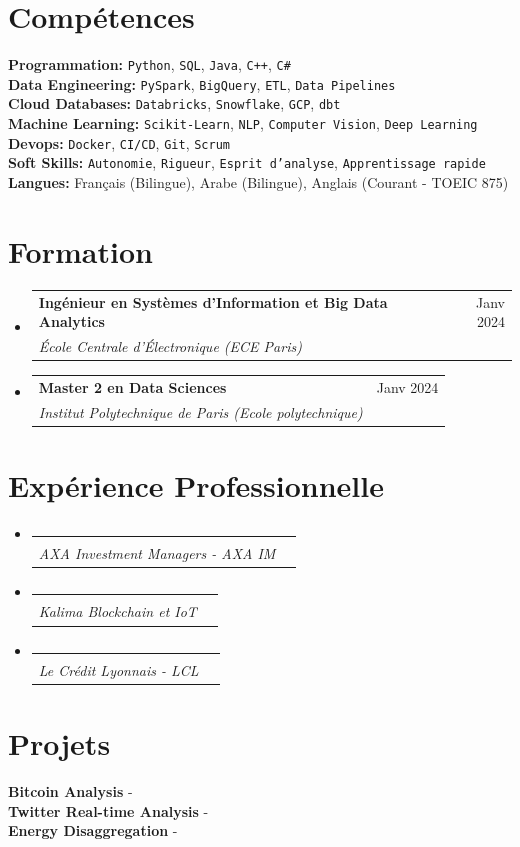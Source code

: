 \documentclass[11pt,a4paper]{article}
\makeatletter
\newcommand{\resumeSubheading}[4]{
  \vspace{2pt}\item
    \begin{tabular*}{\textwidth}[t]{l@{\extracolsep{\fill}}r}
      {\footnotesize\textbf{#1}} & {\footnotesize#2} \\
      {\footnotesize\textit{#3}} & {\footnotesize\textit{#4}} \\
    \end{tabular*}\vspace{2pt}
}
\newcommand{\resumeSubHeadingListStart}{\begin{itemize}[leftmargin=0in, label={}]}
\newcommand{\resumeSubHeadingListEnd}{\end{itemize}}
\newcommand{\resumeItemListStart}{\begin{itemize}[label={\textbullet}]}
\newcommand{\resumeItemListEnd}{\end{itemize}\vspace{0pt}}
\makeatother
\begin{document}
\vspace{10pt}
\section{Compétences}
\textbf{Programmation:} \texttt{Python}, \texttt{SQL}, \texttt{Java}, \texttt{C++}, \texttt{C#} \\
\textbf{Data Engineering:} \texttt{PySpark}, \texttt{BigQuery}, \texttt{ETL}, \texttt{Data Pipelines} \\
\textbf{Cloud Databases:} \texttt{Databricks}, \texttt{Snowflake}, \texttt{GCP}, \texttt{dbt} \\
\textbf{Machine Learning:} \texttt{Scikit-Learn}, \texttt{NLP}, \texttt{Computer Vision}, \texttt{Deep Learning} \\
\textbf{Devops:} \texttt{Docker}, \texttt{CI/CD}, \texttt{Git}, \texttt{Scrum} \\
\textbf{Soft Skills:} \texttt{Autonomie}, \texttt{Rigueur}, \texttt{Esprit d'analyse}, \texttt{Apprentissage rapide} \\
\textbf{Langues:} Français (Bilingue), Arabe (Bilingue), Anglais (Courant - TOEIC 875) \\

\vspace{10pt}
\section{Formation}
\resumeSubHeadingListStart
\resumeSubheading
{Ingénieur en Systèmes d'Information et Big Data Analytics}{Janv 2024}
{École Centrale d'Électronique (ECE Paris)}{}

\resumeSubheading
{Master 2 en Data Sciences}{Janv 2024}
{Institut Polytechnique de Paris (Ecole polytechnique)}{}

\resumeSubHeadingListEnd

\vspace{10pt}
\section{Expérience Professionnelle}
\resumeSubHeadingListStart
\resumeSubheading
{}{}
{AXA Investment Managers - AXA IM}{}

\resumeSubheading
{}{}
{Kalima Blockchain et IoT}{}

\resumeSubheading
{}{}
{Le Crédit Lyonnais - LCL}{}

\resumeSubHeadingListEnd

\vspace{10pt}
\section{Projets}
\resumeItemListStart
\textbf{Bitcoin Analysis} -  \\
\textbf{Twitter Real-time Analysis} -  \\
\textbf{Energy Disaggregation \@Capgemini} -  \\
\resumeItemListEnd
\end{document}
